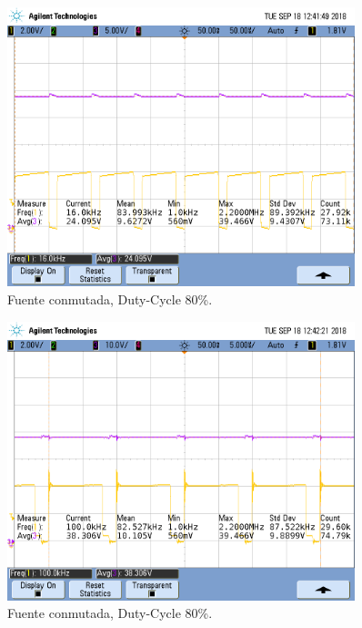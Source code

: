 \begin{figure}[H]
	\centering
	\includegraphics[width=0.9\textwidth]{Imagenes/dc_82.png}
\caption{Fuente conmutada, Duty-Cycle 80\%.}
	\label{fig:fcon}
\end{figure}
\begin{figure}[H]
	\centering
	\includegraphics[width=0.9\textwidth]{Imagenes/dc_83.png}
\caption{Fuente conmutada, Duty-Cycle 80\%.}
	\label{fig:fcon}
\end{figure}
